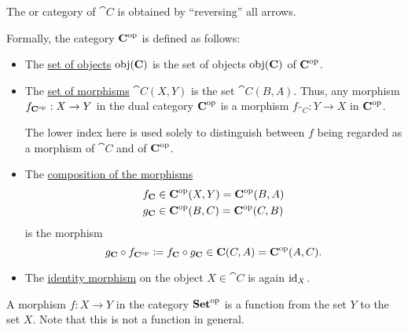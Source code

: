 \begin{definition}\label{def:dual_category}
  The  or  category of \( \cat{C} \) is obtained by \enquote{reversing} all arrows.

  Formally, the category \( \operatorname{\mathbf{C}}^{\operatorname{op}} \) is defined as follows:
  \begin{itemize}
    \item The \hyperref[def:category/objects]{set of objects} \( \operatorname{obj}(\operatorname{\mathbf{C}}) \) is the set of objects \( \operatorname{obj}(\operatorname{\mathbf{C}}) \) of \( \operatorname{\mathbf{C}}^{\operatorname{op}} \).

    \item The \hyperref[def:category/morphisms]{set of morphisms} \( \cat{C}(X, Y) \) is the set \( \cat{C}(B, A) \). Thus, any morphism \( f_{\operatorname{\mathbf{C}}^{\operatorname{op}}}: X \to Y \) in the dual category \( \operatorname{\mathbf{C}}^{\operatorname{op}} \) is a morphism \( f_{\cat{C}}: Y \to X \) in \( \operatorname{\mathbf{C}}^{\operatorname{op}} \).

    The lower index here is used solely to distinguish between \( f \) being regarded as a morphism of \( \cat{C} \) and of \( \operatorname{\mathbf{C}}^{\operatorname{op}} \).

    \item The \hyperref[def:category/composition]{composition of the morphisms}
    \begin{align*}
      f_{\operatorname{\mathbf{C}}} &\in \operatorname{\mathbf{C}}^{\operatorname{op}}(X, Y) = \operatorname{\mathbf{C}}^{\operatorname{op}}(B, A) \\
      g_{\operatorname{\mathbf{C}}} &\in \operatorname{\mathbf{C}}^{\operatorname{op}}(B, C) = \operatorname{\mathbf{C}}^{\operatorname{op}}(C, B)
    \end{align*}
    is the morphism
    \begin{equation*}
      g_{\cat{C}} \bincirc f_{\cat{C}^{\opcat}} \coloneqq f_{\cat{C}} \bincirc g_{\cat{C}} \in \cat{C}(C, A) = \cat{C}^{\opcat}(A, C).
    \end{equation*}

    \item The \hyperref[def:category/identity]{identity morphism} on the object \( X \in \cat{C} \) is again \( \operatorname{id}_X \).
  \end{itemize}
\end{definition}

\begin{example}\label{ex:def:dual_category}
  A morphism \( f: X \to Y \) in the category \( \operatorname{\mathbf{Set}}^{\operatorname{op}} \) is a function from the set \( Y \) to the set \( X \). Note that this is not a function in general.
\end{example}

